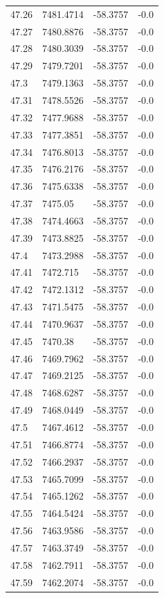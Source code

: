 \begin{table}[H]
\begin{tabular}{llll}
47.26 & 7481.4714 & -58.3757 & -0.0 \\
47.27 & 7480.8876 & -58.3757 & -0.0 \\
47.28 & 7480.3039 & -58.3757 & -0.0 \\
47.29 & 7479.7201 & -58.3757 & -0.0 \\
47.3 & 7479.1363 & -58.3757 & -0.0 \\
47.31 & 7478.5526 & -58.3757 & -0.0 \\
47.32 & 7477.9688 & -58.3757 & -0.0 \\
47.33 & 7477.3851 & -58.3757 & -0.0 \\
47.34 & 7476.8013 & -58.3757 & -0.0 \\
47.35 & 7476.2176 & -58.3757 & -0.0 \\
47.36 & 7475.6338 & -58.3757 & -0.0 \\
47.37 & 7475.05 & -58.3757 & -0.0 \\
47.38 & 7474.4663 & -58.3757 & -0.0 \\
47.39 & 7473.8825 & -58.3757 & -0.0 \\
47.4 & 7473.2988 & -58.3757 & -0.0 \\
47.41 & 7472.715 & -58.3757 & -0.0 \\
47.42 & 7472.1312 & -58.3757 & -0.0 \\
47.43 & 7471.5475 & -58.3757 & -0.0 \\
47.44 & 7470.9637 & -58.3757 & -0.0 \\
47.45 & 7470.38 & -58.3757 & -0.0 \\
47.46 & 7469.7962 & -58.3757 & -0.0 \\
47.47 & 7469.2125 & -58.3757 & -0.0 \\
47.48 & 7468.6287 & -58.3757 & -0.0 \\
47.49 & 7468.0449 & -58.3757 & -0.0 \\
47.5 & 7467.4612 & -58.3757 & -0.0 \\
47.51 & 7466.8774 & -58.3757 & -0.0 \\
47.52 & 7466.2937 & -58.3757 & -0.0 \\
47.53 & 7465.7099 & -58.3757 & -0.0 \\
47.54 & 7465.1262 & -58.3757 & -0.0 \\
47.55 & 7464.5424 & -58.3757 & -0.0 \\
47.56 & 7463.9586 & -58.3757 & -0.0 \\
47.57 & 7463.3749 & -58.3757 & -0.0 \\
47.58 & 7462.7911 & -58.3757 & -0.0 \\
47.59 & 7462.2074 & -58.3757 & -0.0 \\

\end{tabular}
\end{table}
